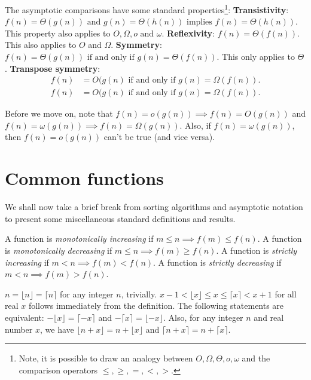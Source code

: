 \documentclass[12pt]{article}
\begin{document}
The asymptotic comparisons have some standard properties\footnote{Note, it is possible to draw an analogy between $O, \Omega, \Theta, o, \omega$ and the comparison operators
$\leq, \geq, =, <, >$.}:
\newline \textbf{Transistivity}: $f(n) = \Theta(g(n)) \text{ and } g(n) = \Theta(h(n)) \text{ implies } f(n) = \Theta(h(n))$.
This property also applies to $O, \Omega, o \text{ and }\omega$.
\newline \textbf{Reflexivity}: $f(n) = \Theta(f(n))$. This also applies to $O$ and $\Omega$.
\newline \textbf{Symmetry}: $f(n) = \Theta(g(n)) \text{ if and only if } g(n) = \Theta(f(n))$. This only applies to $\Theta$.
\newline \textbf{Transpose symmetry}:
\begin{align*}
    f(n)&= O(g(n) \text{ if and only if } g(n) = \Omega(f(n)).\\
    f(n)&= O(g(n) \text{ if and only if } g(n) = \Omega(f(n)).
\end{align*}

Before we move on, note that $f(n) = o(g(n)) \implies f(n) = O(g(n))$ and $f(n) = \omega(g(n)) \implies f(n) = \Omega(g(n))$.
Also, if $f(n) = \omega(g(n))$, then $f(n) = o(g(n))$ can't be true (and vice versa).

\section{Common functions}
We shall now take a brief break from sorting algorithms and asymptotic notation to present some miscellaneous
standard definitions and results.

A function is \textit{monotonically increasing} if $m \leq n \implies f(m) \leq f(n)$.
A function is \textit{monotonically decreasing} if $m \leq n \implies f(m) \geq f(n)$.
A function is \textit{strictly increasing} if $m < n \implies f(m) < f(n)$.
A function is \textit{strictly decreasing} if $m < n \implies f(m) > f(n)$.

$n = \lfloor n\rfloor = \lceil n\rceil$ for any integer $n$, trivially. $x - 1 < \lfloor x\rfloor \leq x
\leq \lceil x\rceil < x + 1$ for all real $x$ follows immediately from the definition. The following statements are equivalent:
$-\lfloor x \rfloor = \lceil-x\rceil$ and $-\lceil x \rceil = \lfloor-x\rfloor$. Also, for any integer
$n$ and real number $x$, we have $\lfloor n + x\rfloor = n+ \lfloor x\rfloor$ and $\lceil n + x\rceil = n+ \lceil x\rceil$.
\end{document}
